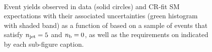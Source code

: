 \begin{figure}[h!]
\begin{center}
    \\
    \caption{Event yields observed in data (solid circles) and CR-fit SM expectations with their associated uncertainties (green histogram with shaded band) as a function of \HTmiss based on a sample of events that satisfy $n_{\text{jet}} = 5$ and $n_{\text{b}} = 0$, as well as the requirements on \scalht indicated by each sub-figure caption. }
    \label{fig:mhtval_eq5j_eq0b}
  \end{center}
\end{figure}

